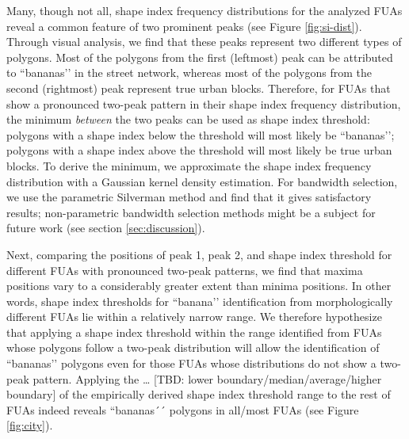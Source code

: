 Many, though not all, shape index frequency distributions for the analyzed FUAs reveal a common feature of two prominent peaks (see Figure \ref{fig:si-dist}). Through visual analysis, we find that these peaks represent two different types of polygons. Most of the polygons from the first (leftmost) peak can be attributed to ``bananas’’ in the street network, whereas most of the polygons from the second (rightmost) peak represent true urban blocks. Therefore, for FUAs that show a pronounced two-peak pattern in their shape index frequency distribution, the minimum \textit{between} the two peaks can be used as shape index threshold: polygons with a shape index below the threshold will most likely be ``bananas’’; polygons with a shape index above the threshold will most likely be true urban blocks. To derive the minimum, we approximate the shape index frequency distribution with a Gaussian kernel density estimation. For bandwidth selection, we use the parametric Silverman method \cite{silverman_using_1981} and find that it gives satisfactory results; non-parametric bandwidth selection methods might be a subject for future work (see section \ref{sec:discussion}). 

Next, comparing the positions of peak 1, peak 2, and shape index threshold for different FUAs with pronounced two-peak patterns, we find that maxima positions vary to a considerably greater extent than minima positions. In other words, shape index thresholds for ``banana’’ identification from morphologically different FUAs lie within a relatively narrow range. We therefore hypothesize that applying a shape index threshold within the range identified from FUAs whose polygons follow a two-peak distribution will allow the identification of ``bananas’’ polygons even for those FUAs whose distributions do not show a two-peak pattern. Applying the … [TBD: lower boundary/median/average/higher boundary] of the empirically derived shape index threshold range to the rest of FUAs indeed reveals ``bananas´´ polygons in all/most FUAs (see Figure \ref{fig:city}).